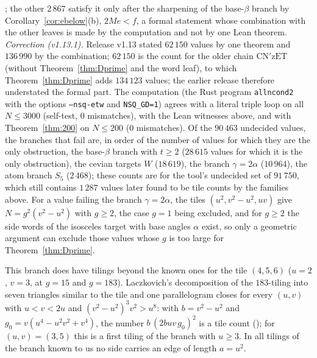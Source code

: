 \documentclass[11pt,reqno]{amsart}
\theoremstyle{plain}
\theoremstyle{definition}
\begin{document}
; the other $2\,867$ satisfy it only after the sharpening of the base-$\beta$ branch by
Corollary~\ref{cor:ebelow}(b), $2Me<f$, a formal statement whose combination with the other leaves is made by the computation and not by one Lean theorem.
\emph{Correction (v1.13.1).} Release v1.13 stated $62\,150$ values by one theorem and $136\,990$ by the combination; $62\,150$ is the count for the older
chain $\mathrm{CN'zET}$ (without Theorem~\ref{thm:Dprime} and the word leaf), to which Theorem~\ref{thm:Dprime} adds $134\,123$ values; the earlier release therefore understated the formal part.
The computation (the Rust program \texttt{allncond2} with the options \texttt{--nsq-etw} and \texttt{NSQ\_GD=1}) agrees with a literal triple loop on all $N\le3000$ (self-test, $0$ mismatches), with the Lean witnesses above, and with Theorem~\ref{thm:200} on $N\le200$ ($0$ mismatches). Of the $90\,463$ undecided values, the branches that fail are, in order of the number of values for which they are the only obstruction, the
base-$\beta$ branch with $t\ge2$ ($28\,615$ values for which it is the only obstruction), the cevian targets $W$ ($18\,619$), the branch $\gamma=2\alpha$ ($10\,964$), the atom branch $S_5$ ($2\,468$); these counts are for the tool's undecided set of $91\,750$, which still contains $1\,287$ values later found to be tile counts by the families above.
For a value failing the branch $\gamma=2\alpha$, the tiles $(u^2,v^2-u^2,uv)$ give
$N=g^2(v^2-u^2)$ with $g\ge2$, the case $g=1$ being excluded, and for $g\ge2$ the side words of the isosceles target with
base angles $\alpha$ exist, so only a geometric argument can exclude those values whose $g$ is too large for Theorem~\ref{thm:Dprime}.

This branch does have tilings beyond the known ones for the tile $(4,5,6)$ ($u=2$, $v=3$, at $g=15$ and $g=183$).
Laczkovich's decomposition of the $183$-tiling into seven triangles similar to the tile and one parallelogram
closes for every $(u,v)$ with $u<v<2u$ and $(v^2-u^2)^3v^2>u^8$: with $b=v^2-u^2$ and $g_0=v(u^4-u^2v^2+v^4)$, the number
$b\,(2buv\,g_0)^2$ is a tile count (); for $(u,v)=(3,5)$ this is a first tiling of
the branch with $u\ge3$. In all tilings of the branch known to us no side carries an edge of length $a=u^2$.
\end{document}

